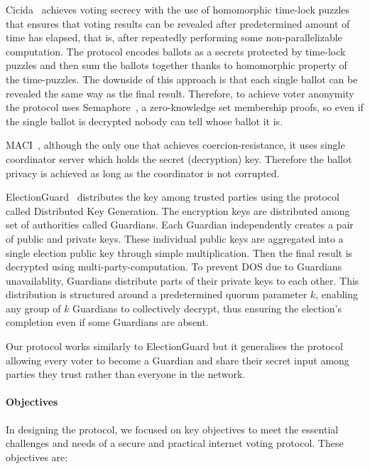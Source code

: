 \documentclass[runningheads]{llncs}
\begin{document}
Cicida~\cite{BuildingCicadaPrivate,A16zCicada2023} achieves voting secrecy with the use of homomorphic time-lock puzzles~\cite{malavoltaHomomorphicTimeLockPuzzles2019} that ensures that voting results can be revealed after predetermined amount of time has elapsed, that is, after repeatedly performing some non-parallelizable computation. The protocol encodes ballots as a secrets protected by time-lock puzzles and then sum the ballots together thanks to homomorphic property of the time-puzzles. The downside of this approach is that each single ballot can be revealed the same way as the final result. Therefore, to achieve voter anonymity the protocol uses Semaphore~\cite{Semaphore}, a zero-knowledge set membership proofs, so even if the single ballot is decrypted nobody can tell whose ballot it is.

MACI~\cite{ethereumfoundationMinimalAntiCollusionInfrastructure2022,PrivacyscalingexplorationsMaci2023}, although the only one that achieves coercion-resistance, it uses single coordinator server which holds the secret (decryption) key. Therefore the ballot privacy is achieved as long as the coordinator is not corrupted.

ElectionGuard~\cite{ElectionGuard} distributes the key among trusted parties using the protocol called Distributed Key Generation. The encryption keys are distributed among set of authorities called Guardians. Each Guardian independently creates a pair of public and private keys. These individual public keys are aggregated into a single election public key through simple multiplication. Then the final result is decrypted using multi-party-computation. To prevent DOS due to Guardians unavailablity, Guardians distribute parts of their private keys to each other. This distribution is structured around a predetermined quorum parameter $k$, enabling any group of $k$ Guardians to collectively decrypt, thus ensuring the election's completion even if some Guardians are absent.

Our protocol works similarly to ElectionGuard but it generalises the protocol allowing every voter to become a Guardian and share their secret input among parties they trust rather than everyone in the network. 

\paragraph{Objectives}
In designing the protocol, we focused on key objectives to meet the essential challenges and needs of a secure and practical internet voting protocol. These objectives are:
\end{document}
